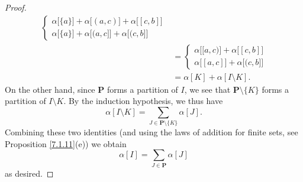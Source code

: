 \begin{proof}
\begin{align*}
\begin{cases}
            \alpha\big[\{a\}\big] + \alpha\big[(a, c)\big] + \alpha\big[[c, b]\big] \\
            \alpha\big[\{a\}\big] + \alpha\big[(a, c]\big] + \alpha\big[(c, b]\big]
        \end{cases}                      \\
                               & = \begin{cases}
            \alpha\big[[a, c)\big] + \alpha\big[[c, b]\big] \\
                \alpha\big[[a, c]\big] + \alpha\big[(c, b]\big]
        \end{cases}                      \\
                               & = \alpha[K] + \alpha[I \setminus K].
    \end{align*}
    On the other hand, since \(\mathbf{P}\) forms a partition of \(I\), we see that \(\mathbf{P} \setminus \{K\}\) forms a partition of \(I \setminus K\).
    By the induction hypothesis, we thus have
    \[
        \alpha[I \setminus K] = \sum_{J \in \mathbf{P} \setminus \{K\}} \alpha[J].
    \]
    Combining these two identities (and using the laws of addition for finite sets, see Proposition \ref{7.1.11}(e)) we obtain
    \[
        \alpha[I] = \sum_{J \in \mathbf{P}} \alpha[J]
    \]
    as desired.


\end{proof}
